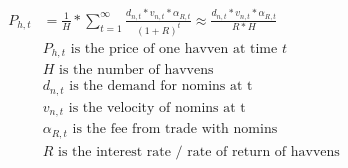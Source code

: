 \begin{align} 
\begin{split}
P_{h,t} &= \frac{1}{H}* \sum\limits_{t=1}^\infty \frac{d_{n,t} *v_{n,t} * \alpha_{R,t}}{(1+R)^t} \approx \frac{d_{n,t} *v_{n,t} * \alpha_{R,t}}{R * H} \\
& P_{h,t} \text{ is the price of one havven at time } t  \\
& H \text{ is the number of havvens}  \\
& d_{n,t} \text{ is the demand for nomins at t}  \\
& v_{n,t} \text{ is the velocity of nomins at t}  \\
& \alpha_{R,t} \text{ is the fee from trade with nomins}  \\
& R \text{ is the interest rate / rate of return of havvens}  \\
\end{split}
\end{align}   

\newpage

